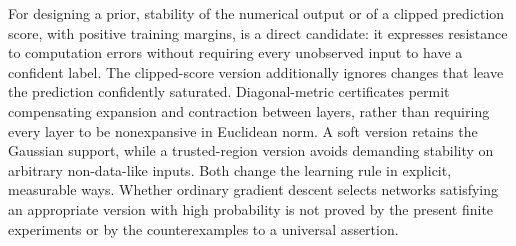 \documentclass[11pt]{article}
\begin{document}
For designing a prior, stability of the numerical output or of a clipped
prediction score, with positive training margins, is a direct candidate: it expresses resistance to computation
errors without requiring every unobserved input to have a confident label.
The clipped-score version additionally ignores changes that leave the
prediction confidently saturated. Diagonal-metric certificates permit
compensating expansion and contraction between layers, rather than requiring
every layer to be nonexpansive in Euclidean norm.
A soft version retains the Gaussian support, while a trusted-region version
avoids demanding stability on arbitrary non-data-like inputs. Both change
the learning rule in explicit, measurable ways. Whether ordinary gradient
descent selects networks satisfying an appropriate version with high
probability is not proved by the present finite experiments or by the
counterexamples to a universal assertion.

\appendix




\end{document}
